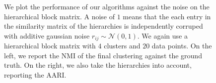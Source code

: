 \onecolumn
\begin{figure}[ht]
    \centering
    \caption{
        We plot the performance of our algorithms against the noise on the hierarchical block matrix. A noise of $1$ means that the each 
        entry in the similarity matrix of the hierarchies is independently corruped with additive gaussian noise $r_{ij} \sim \mathcal{N}(0, 1)$.
        We again use a hierarchical block matrix with $4$ clusters and $20$ data points. On the left, we report the NMI of the final clustering against the ground
        truth. On the right, we also take the hierarchies into account, reporting the AARI.
    }
    \label{fig:hierarchy-add-hierarchy-noise}
\end{figure}


